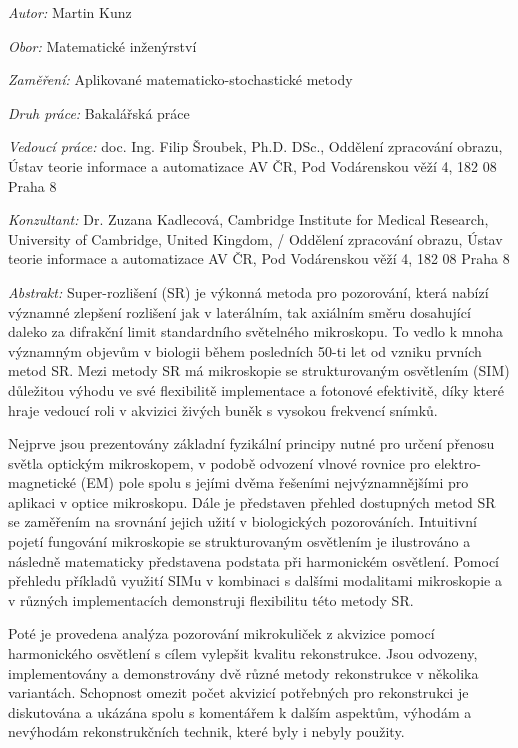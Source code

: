 \bigskip{}

\noindent \emph{Autor:} Martin Kunz

\bigskip{}

\noindent \emph{Obor:} Matematické inženýrství\bigskip{}

\noindent \emph{Zaměření:} Aplikované matematicko-stochastické metody

\bigskip{}

\noindent \emph{Druh práce:} Bakalářská práce

\bigskip{}

\noindent \emph{Vedoucí práce:} doc. Ing. Filip Šroubek, Ph.D. DSc.,
Oddělení zpracování obrazu, Ústav teorie informace a automatizace AV ČR, Pod Vodárenskou věží 4, 182 08 Praha 8

\bigskip{}

\noindent \emph{Konzultant:} Dr. Zuzana Kadlecová,
Cambridge Institute for Medical Research, University of Cambridge, United Kingdom, / Oddělení zpracování obrazu, Ústav 
teorie informace a automatizace AV ČR, Pod Vodárenskou věží 4, 182 08 Praha 8

\bigskip{}

\noindent \emph{Abstrakt:} 
Super-rozlišení (SR) je výkonná metoda pro pozorování, která nabízí významné zlepšení rozlišení jak v laterálním, tak 
    axiálním směru dosahující daleko za difrakční limit standardního světelného mikroskopu.
To vedlo k mnoha významným objevům v biologii během posledních 50-ti let od vzniku prvních metod SR.
Mezi metody SR má mikroskopie se strukturovaným osvětlením (SIM) důležitou výhodu ve své flexibilitě implementace a 
    fotonové efektivitě, díky které hraje vedoucí roli v akvizici živých buněk s vysokou frekvencí snímků.

Nejprve jsou prezentovány základní fyzikální principy nutné pro určení přenosu světla optickým \linebreak mikroskopem, 
    v podobě odvození vlnové rovnice pro elektro-magnetické (EM) pole spolu s jejími dvěma řešeními nejvýznamnějšími pro 
    aplikaci v optice mikroskopu. 
Dále je představen přehled dostupných metod SR se zaměřením na srovnání jejich užití v biologických pozorováních.
Intuitivní pojetí fungování mikroskopie se strukturovaným osvětlením je ilustrováno a následně matematicky představena 
    podstata při harmonickém osvětlení.
Pomocí přehledu příkladů využití SIMu v kombinaci s dalšími modalitami mikroskopie a v různých implementacích 
    demonstruji flexibilitu této metody SR.

Poté je provedena analýza pozorování mikrokuliček z akvizice pomocí harmonického osvětlení s cílem vylepšit kvalitu 
    rekonstrukce. 
Jsou odvozeny, implementovány a demonstrovány dvě různé metody rekonstrukce v několika variantách. 
Schopnost omezit počet akvizicí potřebných pro rekonstrukci je diskutována a ukázána spolu s komentářem k dalším 
    aspektům, výhodám a nevýhodám rekonstrukčních technik, které byly i nebyly použity.

